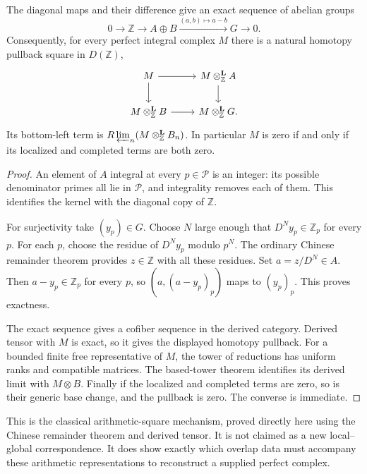 \begin{theorem}\label{thm:arithmetic-fracture}
The diagonal maps and their difference give an exact sequence of abelian groups
\[
 0\longrightarrow\mathbb Z
 \longrightarrow A\oplus B
 \xrightarrow{(a,b)\mapsto a-b}G
 \longrightarrow0.
\]
Consequently, for every perfect integral complex $M$ there is a natural homotopy pullback square in $D(\mathbb Z)$,
\[
 \begin{tikzcd}
 M\arrow[r]\arrow[d]&M\otimes^{\mathbf L}_{\mathbb Z}A\arrow[d]\\
 M\otimes^{\mathbf L}_{\mathbb Z}B\arrow[r]&M\otimes^{\mathbf L}_{\mathbb Z}G.
 \end{tikzcd}
\]
Its bottom-left term is $R\varprojlim_n(M\otimes^{\mathbf L}_{\mathbb Z}B_n)$. In particular $M$ is zero if and only if its localized and completed terms are both zero.
\end{theorem}
\begin{proof}
An element of $A$ integral at every $p\in\mathcal P$ is an integer: its possible denominator primes all lie in $\mathcal P$, and integrality removes each of them. This identifies the kernel with the diagonal copy of $\mathbb Z$.

For surjectivity take $(y_p)\in G$. Choose $N$ large enough that $D^Ny_p\in\mathbb Z_p$ for every $p$. For each $p$, choose the residue of $D^Ny_p$ modulo $p^N$. The ordinary Chinese remainder theorem provides $z\in\mathbb Z$ with all these residues. Set $a=z/D^N\in A$. Then $a-y_p\in\mathbb Z_p$ for every $p$, so $(a,(a-y_p)_p)$ maps to $(y_p)_p$. This proves exactness.

The exact sequence gives a cofiber sequence in the derived category. Derived tensor with $M$ is exact, so it gives the displayed homotopy pullback. For a bounded finite free representative of $M$, the tower of reductions has uniform ranks and compatible matrices. The based-tower theorem identifies its derived limit with $M\otimes B$. Finally if the localized and completed terms are zero, so is their generic base change, and the pullback is zero. The converse is immediate.
\end{proof}

This is the classical arithmetic-square mechanism, proved directly here using the Chinese remainder theorem and derived tensor. It is not claimed as a new local--global correspondence. It does show exactly which overlap data must accompany these arithmetic representations to reconstruct a supplied perfect complex.

